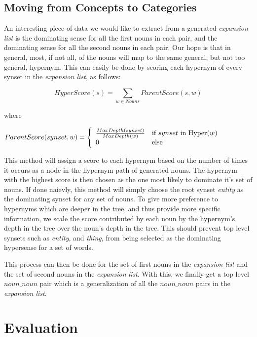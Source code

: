 \documentclass[11pt]{article}
\begin{document}
\subsection{Moving from Concepts to Categories}

An interesting piece of data we would like to extract from a generated
\emph{expansion list} is the dominating sense for all the first nouns in each
pair, and the dominating sense for all the second nouns in each pair.  Our hope
is that in general, most, if not all, of the nouns will map to the same general, but
not too general, hypernym.  This can easily be done by scoring each hypernym of
every synset in the \emph{expansion list}, as follows:

\small
\[ HyperScore(s) = \displaystyle\sum_{w \in Nouns} ParentScore(s, w) 
\]

\normalsize
where

\small
$ ParentScore(synset, w) = \left\{ 
 \begin{array}{l l}
   {\frac {MaxDepth(synset)} {MaxDepth(w)}} & \mbox{if $synset$ in Hyper($w$)}\\
   0 & \mbox{else}\\
 \end{array} \right.
$

\normalsize
This method will assign a score to each hypernym based on the number of times it
occurs as a node in the hypernym path of generated nouns.  The hypernym with the
highest score is then chosen as the one most likely to dominate it's set of nouns.
If done naievly, this method will simply choose the root synset \emph{entity} as
the dominating synset for any set of nouns.  To give more preference
to hypernyms which are deeper in the tree, and thus provide more specific
information, we scale the score contributed by each noun by the hypernym's
depth in the tree over the noun's depth in the tree.  This should prevent top
level synsets such as \emph{entity}, and \emph{thing}, from being selected as 
the dominating hypersense for a set of words.  

This process can then be done for the set of first nouns in the \emph{expansion
list} and the set of second nouns in the \emph{expansion list}.  With this, we
finally get a top level $noun\_noun$ pair which is a generalization of all the
$noun\_noun$ pairs in the \emph{expansion list}.

\section{Evaluation}
\label{sec:evaluation}
\end{document}
